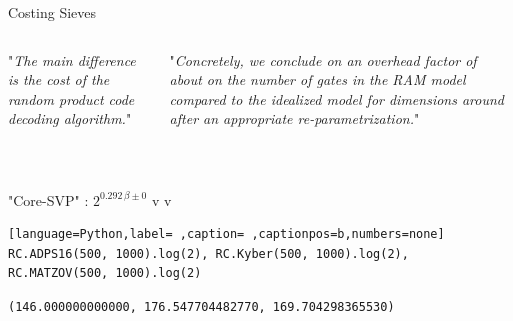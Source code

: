 \documentclass[table,10pt,aspectratio=169]{beamer}
\begin{document}
\begin{frame}[label={sec:org77eda80},fragile]{Costing Sieves}
 \begin{columns}[t]
\begin{column}{0.5\columnwidth}
"\emph{The main difference is the cost of the random product code decoding algorithm.}"

\ \\
\scriptsize

\end{column}

\begin{column}{0.5\columnwidth}
"\emph{Concretely, we conclude on an overhead factor of about  on the number of gates in the RAM model compared to the idealized model for dimensions around  after an appropriate re-parametrization.}"

\ \\
\scriptsize

\end{column}
\end{columns}

"Core-SVP" \cite{USENIX:ADPS16}: \(2^{0.292\,\beta \pm 0}\) v \cite{NISTPQC-R3:CRYSTALS-KYBER20,AC:AGPS20} v \cite{Matzov22}

\begin{lstlisting}[language=Python,label= ,caption= ,captionpos=b,numbers=none]
RC.ADPS16(500, 1000).log(2), RC.Kyber(500, 1000).log(2), RC.MATZOV(500, 1000).log(2)
\end{lstlisting}

\begin{verbatim}
(146.000000000000, 176.547704482770, 169.704298365530)
\end{verbatim}
\end{frame}
\end{document}
